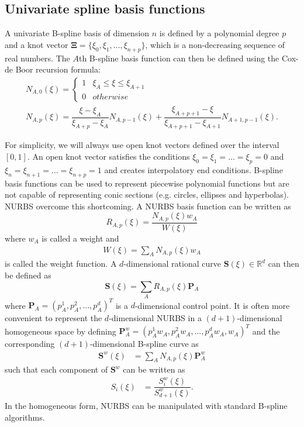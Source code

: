 \documentclass{article}
\newcommand{\rn}{\mathbb{R}^d}
\begin{document}
\subsection{Univariate spline basis functions}
A univariate B-spline basis of dimension $n$ is defined by a polynomial degree $p$ and a knot vector $\mathbf{\Xi}=\lbrace{\xi_0,\xi_1,\ldots, \xi_{n+p}}\rbrace$, which is a non-decreasing sequence of real numbers. The $A$th B-spline basis function can then be defined using the Cox-de Boor recursion formula:
\begin{gather}
N_{A,0}(\xi)=\begin{cases}1 & \xi_A\leq{\xi}\leq{\xi_{A+1}}\\0 & otherwise \end{cases} \\
N_{A,p}(\xi)=\dfrac{\xi-\xi_A}{\xi_{A+p}-\xi_A}N_{A,p-1}(\xi)+\dfrac{\xi_{A+p+1}-\xi}{\xi_{A+p+1}-\xi_{A+1}}N_{A+1,p-1}(\xi).
\end{gather}\par
For simplicity, we will always use open knot vectors defined over the interval $\left[ 0,1\right]$. An open knot vector satisfies the conditions $\xi_0=\xi_1=\dots=\xi_{p}=0$ and $\xi_{n}=\xi_{n+1}=\dots=\xi_{n+p}=1$ and creates interpolatory end conditions. B-spline basis functions can be used to represent piecewise polynomial functions but are not capable of representing conic sections (e.g. circles, ellipses and hyperbolas). NURBS overcome this shortcoming. A NURBS basis function can be written as
\begin{equation}
R_{A,p}(\xi)=\dfrac{N_{A,p}(\xi)w_A}{W{(\xi)}}
\end{equation}
where $w_A$ is called a weight and
\begin{align}
  \label{eq:weight}
W(\xi)=\sum_{A} N_{A,p}(\xi)w_A
\end{align}
is called the weight function. A $d$-dimensional rational curve $\mathbf{S}(\xi)\in{\rn}$ can then be defined as
\begin{equation}
\mathbf{S}(\xi)=\sum_A R_{A,p}(\xi)\mathbf{P}_A
\end{equation}
where $\mathbf{P}_A=(p_A^1,p_A^2,\ldots,p_A^d)^T$ is a $d$-dimensional control point. It is often more convenient to represent the $d$-dimensional NURBS in a $(d+1)$-dimensional homogeneous space by defining $\mathbf{P}_A^w=(p_A^1w_A,p_A^2w_A,\ldots,p_A^dw_A,w_A)^T$ and the corresponding $(d+1)$-dimensional B-spline curve as
\begin{align}
\mathbf{S}^w(\xi)&=\sum_A N_{A,p}(\xi)\mathbf{P}_A^w
\end{align}
such that each component of $\mathbf{S}^w$ can be written as
\begin{align}
S_i(\xi)&=\dfrac{{S}_i^w(\xi)}{{S}_{d+1}^w(\xi)}.
\end{align}
In the homogeneous form, NURBS can be manipulated with standard B-spline algorithms.
\end{document}
